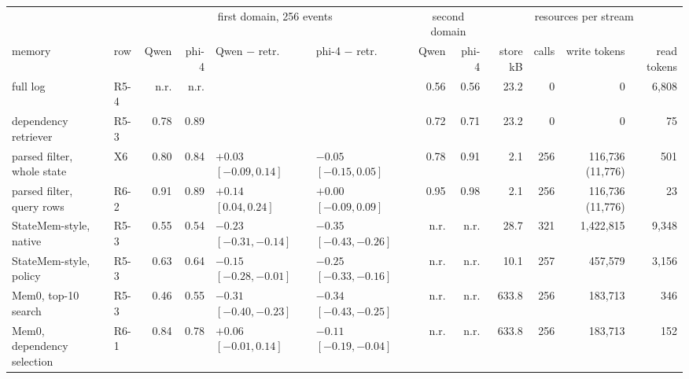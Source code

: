 \begin{tabular}{@{}llrrllrrrrrr@{}}
\toprule
 & & \multicolumn{4}{c}{first domain, 256 events} & \multicolumn{2}{c}{second domain} & \multicolumn{4}{c}{resources per stream} \\
\cmidrule(lr){3-6}\cmidrule(lr){7-8}\cmidrule(l){9-12}
memory & row & Qwen & phi-4 & Qwen $-$ retr. & phi-4 $-$ retr. & Qwen & phi-4 & store kB & calls & write tokens & read tokens \\
\midrule
full log & R5-4 & n.r. & n.r. &  &  & 0.56 & 0.56 & 23.2 & 0 & 0 & 6{,}808 \\
dependency retriever & R5-3 & 0.78 & 0.89 &  &  & 0.72 & 0.71 & 23.2 & 0 & 0 & 75 \\
parsed filter, whole state & X6 & 0.80 & 0.84 & $+0.03$ $[-0.09,0.14]$ & $-0.05$ $[-0.15,0.05]$ & 0.78 & 0.91 & 2.1 & 256 & 116{,}736 (11{,}776) & 501 \\
parsed filter, query rows & R6-2 & 0.91 & 0.89 & $+0.14$ $[0.04,0.24]$ & $+0.00$ $[-0.09,0.09]$ & 0.95 & 0.98 & 2.1 & 256 & 116{,}736 (11{,}776) & 23 \\
StateMem-style, native & R5-3 & 0.55 & 0.54 & $-0.23$ $[-0.31,-0.14]$ & $-0.35$ $[-0.43,-0.26]$ & n.r. & n.r. & 28.7 & 321 & 1{,}422{,}815 & 9{,}348 \\
StateMem-style, policy & R5-3 & 0.63 & 0.64 & $-0.15$ $[-0.28,-0.01]$ & $-0.25$ $[-0.33,-0.16]$ & n.r. & n.r. & 10.1 & 257 & 457{,}579 & 3{,}156 \\
Mem0, top-10 search & R5-3 & 0.46 & 0.55 & $-0.31$ $[-0.40,-0.23]$ & $-0.34$ $[-0.43,-0.25]$ & n.r. & n.r. & 633.8 & 256 & 183{,}713 & 346 \\
Mem0, dependency selection & R6-1 & 0.84 & 0.78 & $+0.06$ $[-0.01,0.14]$ & $-0.11$ $[-0.19,-0.04]$ & n.r. & n.r. & 633.8 & 256 & 183{,}713 & 152 \\
\bottomrule
\end{tabular}

